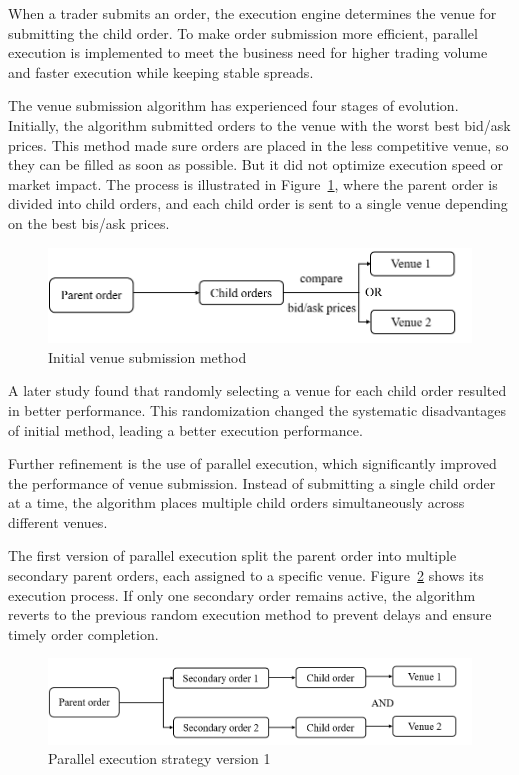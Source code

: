 When a trader submits an order, the execution engine determines the venue for submitting the child order. To make order submission more efficient, parallel execution is implemented to meet the business need for higher trading volume and faster execution while keeping stable spreads.

The venue submission algorithm has experienced four stages of evolution. Initially, the algorithm submitted orders to the venue with the worst best bid/ask prices. This method made sure orders are placed in the less competitive venue, so they can be filled as soon as possible. But it did not optimize execution speed or market impact. The process is illustrated in Figure~\ref{fig:venue_submission_1}, where the parent order is divided into child orders, and each child order is sent to a single venue depending on the best bis/ask prices.

\begin{figure}[h]
    \centering
    \includegraphics[width=0.8\linewidth]{figures/venue_submission_1.png}
    \caption{Initial venue submission method}
    \label{fig:venue_submission_1}
\end{figure}

A later study \citep{romy2023} found that randomly selecting a venue for each child order resulted in better performance. This randomization changed the systematic disadvantages of initial method, leading a better execution performance.

Further refinement is the use of \gls{parallel execution}, which significantly improved the performance of venue submission. Instead of submitting a single child order at a time, the algorithm places multiple child orders simultaneously across different venues. 

The first version of parallel execution split the parent order into multiple secondary parent orders, each assigned to a specific venue. Figure~\ref{fig:venue_submission_2} shows its execution process. If only one secondary order remains active, the algorithm reverts to the previous random execution method to prevent delays and ensure timely order completion. 

\begin{figure}[h]
    \centering
    \includegraphics[width=0.8\linewidth]{figures/venue_submission_2.png}
    \caption{Parallel execution strategy version 1}
    \label{fig:venue_submission_2}
\end{figure}

